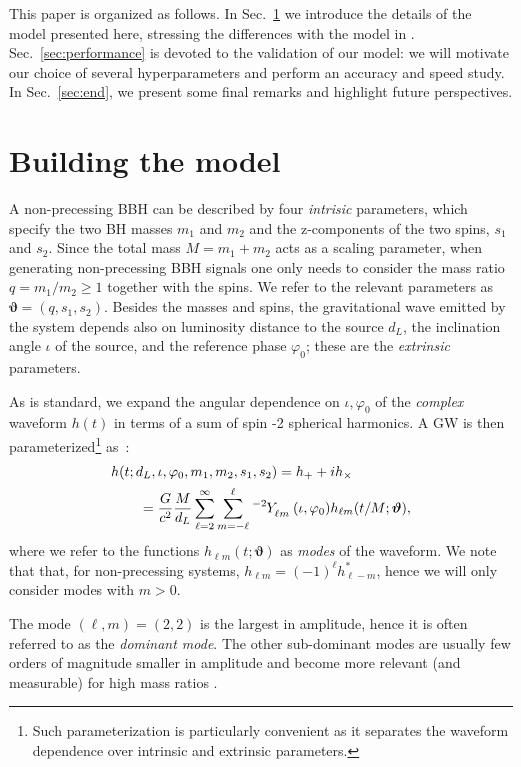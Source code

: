 \documentclass[twocolumn,showpacs,preprintnumbers,nofootinbib,prd,
superscriptaddress,10pt]{revtex4-1}
\begin{document}
This paper is organized as follows. In Sec.~\ref{sec:model} we introduce the details of the model presented here, 
stressing the differences with the model in  \cite{Schmidt:2020yuu}.
Sec.~\ref{sec:performance} is devoted to the validation of our model: we will motivate our choice of several 
hyperparameters and perform an accuracy and speed study.
In Sec.~\ref{sec:end}, we present some final remarks and highlight future perspectives.

\section{Building the model}
\label{sec:model}

A non-precessing BBH can be described by four {\it intrisic} parameters, which specify the two BH masses $m_1$ and $m_2$ 
and the z-components of the two spins, $s_1$ and $s_2$.
Since the total mass $M = m_1 + m_2$ acts as a scaling parameter, when generating non-precessing BBH signals one  
only needs to consider the mass ratio $q = m_1/m_2 \geq 1$ together with the spins. 
We refer to the relevant parameters as $\boldsymbol{\vartheta} = (q, s_1, s_2)$.
Besides the masses and spins, the gravitational wave emitted by the system depends also on 
luminosity distance to the source $d_L$, the inclination angle $\iota$ of the source, and the reference phase 
$\varphi_0$; these are the {\it extrinsic} parameters.

As is standard, we expand the angular dependence on $\iota, \varphi_0$ of the {\it complex} waveform $h(t)$ 
in terms of a sum of spin -2 spherical harmonics.
A GW is then parameterized\footnote{Such parameterization is particularly convenient as it separates 
the waveform dependence over intrinsic and extrinsic parameters.} as~\cite{Estelles:2021gvs}:
\begin{align} \label{eq:h_parametrization}
	&h(t; d_L,\iota,\varphi_0, m_1, m_2, s_1, s_2) = h_+ + i h_\times \nonumber \\
		&\qquad= \frac{G}{c^2} \frac{M}{d_L}\sum_{\ell = 2}^{\infty} \sum_{m = -\ell}^{\ell} \tensor[^{-2}]{Y}{_{\ell m}}(\iota, \varphi_0) h_{\ell m}(t/M; \boldsymbol{\vartheta}),
\end{align}
where we refer to the functions $h_{\ell m}(t; \boldsymbol{\vartheta})$ as {\it modes} of the waveform. We note that that, 
for non-precessing systems, $h_{\ell m} = (-1)^\ell h^*_{\ell -m}$, hence we will only consider modes with $m>0$.

The mode $(\ell, m) = (2,2)$ is the largest in amplitude, hence it is often referred to as the {\it dominant mode}. 
The other sub-dominant modes are usually few orders of magnitude smaller in amplitude and become more relevant 
(and measurable) for high mass ratios \cite{Mills:2020thr, LIGOScientific:2020stg, LIGOScientific:2020zkf}.
\end{document}

